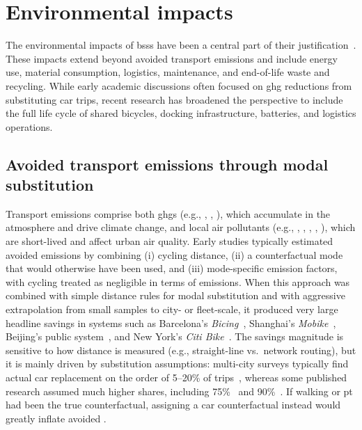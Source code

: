\section{Environmental impacts}
\label{sec:environmental_impacts}

The environmental impacts of \acp{bss} have been a central part of their justification~\cite{Shaheen2010, Fishman2016, Midgley2011}. These impacts extend beyond avoided transport emissions and include energy use, material consumption, logistics, maintenance, and end-of-life waste and recycling. While early academic discussions often focused on \ac{ghg} reductions from substituting car trips, recent research has broadened the perspective to include the full life cycle of shared bicycles, docking infrastructure, batteries, and logistics operations.

    \subsection{Avoided transport emissions through modal substitution} 

    Transport emissions comprise both \acp{ghg} (e.g., , , ), which accumulate in the atmosphere and drive climate change, and local air pollutants (e.g., , , , , ), which are short-lived and affect urban air quality. Early studies typically estimated avoided emissions by combining (i) cycling distance, (ii) a counterfactual mode that would otherwise have been used, and (iii) mode-specific emission factors, with cycling treated as negligible in terms of emissions. When this approach was combined with simple distance rules for modal substitution and with aggressive extrapolation from small samples to city- or fleet-scale, it produced very large headline  savings in systems such as Barcelona's \textit{Bicing}~\cite{Rojas-Rueda2011}, Shanghai's \textit{Mobike}~\cite{Zhang2018}, Beijing's public system~\cite{Qiu2018}, and New York's \textit{Citi Bike}~\cite{Chen2022c}. The savings magnitude is sensitive to how distance is measured (e.g., straight-line vs.\ network routing), but it is mainly driven by substitution assumptions: multi-city surveys typically find actual car replacement on the order of 5--20\% of trips~\cite{Murphy2015, Fishman2013, Fishman2014}, whereas some published research assumed much higher shares, including 75\%~\cite{Qiu2018} and 90\%~\cite{Rojas-Rueda2011}. If walking or \ac{pt} had been the true counterfactual, assigning a car counterfactual instead would greatly inflate avoided .

